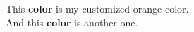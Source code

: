 \documentclass[12pt]{article}
\begin{document}
	
	\noindent
	\huge
	This \textbf{\textcolor{my_orange}{color}} is my customized orange color.\\
	And this \textbf{\textcolor{my_pink}{color}} is another one.
	
\end{document}
